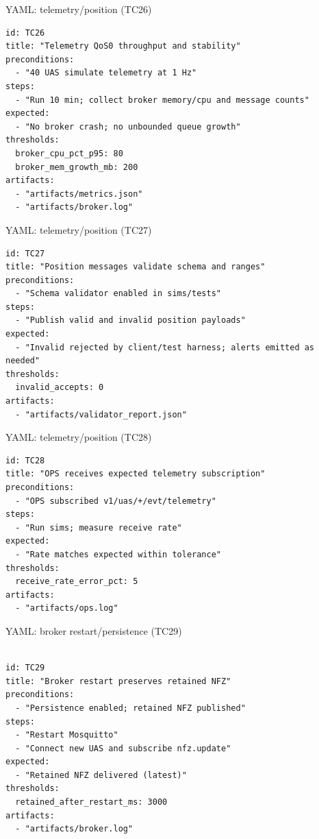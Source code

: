 \documentclass[aspectratio=169]{beamer}
\begin{document}
\begin{frame}[fragile]{YAML: telemetry/position (TC26)}
\begin{Verbatim}[fontsize=\scriptsize, baselinestretch=0.85]
id: TC26
title: "Telemetry QoS0 throughput and stability"
preconditions:
  - "40 UAS simulate telemetry at 1 Hz"
steps:
  - "Run 10 min; collect broker memory/cpu and message counts"
expected:
  - "No broker crash; no unbounded queue growth"
thresholds:
  broker_cpu_pct_p95: 80
  broker_mem_growth_mb: 200
artifacts:
  - "artifacts/metrics.json"
  - "artifacts/broker.log"
\end{Verbatim}
\end{frame}

\begin{frame}[fragile]{YAML: telemetry/position (TC27)}
\begin{Verbatim}[fontsize=\scriptsize, baselinestretch=0.85]
id: TC27
title: "Position messages validate schema and ranges"
preconditions:
  - "Schema validator enabled in sims/tests"
steps:
  - "Publish valid and invalid position payloads"
expected:
  - "Invalid rejected by client/test harness; alerts emitted as needed"
thresholds:
  invalid_accepts: 0
artifacts:
  - "artifacts/validator_report.json"
\end{Verbatim}
\end{frame}

\begin{frame}[fragile]{YAML: telemetry/position (TC28)}
\begin{Verbatim}[fontsize=\scriptsize, baselinestretch=0.85]
id: TC28
title: "OPS receives expected telemetry subscription"
preconditions:
  - "OPS subscribed v1/uas/+/evt/telemetry"
steps:
  - "Run sims; measure receive rate"
expected:
  - "Rate matches expected within tolerance"
thresholds:
  receive_rate_error_pct: 5
artifacts:
  - "artifacts/ops.log"
\end{Verbatim}
\end{frame}

\begin{frame}[fragile]{YAML: broker restart/persistence (TC29)}
\begin{Verbatim}[fontsize=\scriptsize, baselinestretch=0.85]

id: TC29
title: "Broker restart preserves retained NFZ"
preconditions:
  - "Persistence enabled; retained NFZ published"
steps:
  - "Restart Mosquitto"
  - "Connect new UAS and subscribe nfz.update"
expected:
  - "Retained NFZ delivered (latest)"
thresholds:
  retained_after_restart_ms: 3000
artifacts:
  - "artifacts/broker.log"
\end{Verbatim}
\end{frame}
\end{document}
